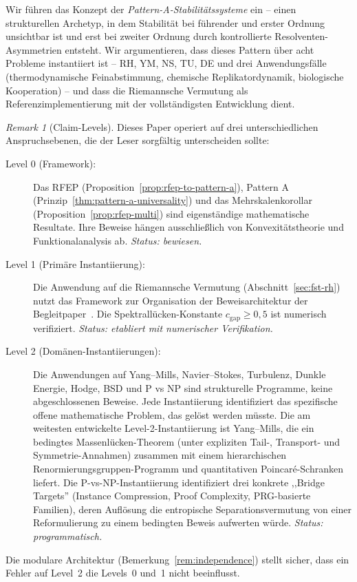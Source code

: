 \documentclass[12pt,a4paper]{article}
\theoremstyle{definition}
\theoremstyle{remark}
\newtheorem{remark}[theorem]{Remark}
\begin{document}
Wir führen das Konzept der \emph{Pattern-A-Stabilitätssysteme} ein -- einen strukturellen Archetyp, in dem Stabilität bei führender und erster Ordnung unsichtbar ist und erst bei zweiter Ordnung durch kontrollierte Resolventen-Asymmetrien entsteht. Wir argumentieren, dass dieses Pattern über acht Probleme instantiiert ist -- RH, YM, NS, TU, DE und drei Anwendungsfälle (thermodynamische Feinabstimmung, chemische Replikatordynamik, biologische Kooperation) -- und dass die Riemannsche Vermutung als Referenzimplementierung mit der vollständigsten Entwicklung dient.

\begin{remark}[Claim-Levels]
\label{rem:claim-levels}
Dieses Paper operiert auf drei unterschiedlichen Anspruchsebenen, die der Leser sorgfältig unterscheiden sollte:
\begin{description}
\item[Level 0 (Framework):] Das RFEP (Proposition~\ref{prop:rfep-to-pattern-a}), Pattern A (Prinzip~\ref{thm:pattern-a-universality}) und das Mehrskalenkorollar (Proposition~\ref{prop:rfep-multi}) sind eigenständige mathematische Resultate. Ihre Beweise hängen ausschließlich von Konvexitätstheorie und Funktionalanalysis ab. \emph{Status: bewiesen.}
\item[Level 1 (Primäre Instantiierung):] Die Anwendung auf die Riemannsche Vermutung (Abschnitt~\ref{sec:fst-rh}) nutzt das Framework zur Organisation der Beweisarchitektur der Begleitpaper~\cite{Geiger2026a,Geiger2026b,Geiger2026c}. Die Spektrallücken-Konstante $c_{\mathrm{gap}} \geq 0{,}5$ ist numerisch verifiziert. \emph{Status: etabliert mit numerischer Verifikation.}
\item[Level 2 (Domänen-Instantiierungen):] Die Anwendungen auf Yang--Mills, Navier--Stokes, Turbulenz, Dunkle Energie, Hodge, BSD und P vs NP sind strukturelle Programme, keine abgeschlossenen Beweise. Jede Instantiierung identifiziert das spezifische offene mathematische Problem, das gelöst werden müsste. Die am weitesten entwickelte Level-2-Instantiierung ist Yang--Mills, die ein bedingtes Massenl\"ucken-Theorem (unter expliziten Tail-, Transport- und Symmetrie-Annahmen) zusammen mit einem hierarchischen Renormierungsgruppen-Programm und quantitativen Poincar\'e-Schranken liefert. Die P-vs-NP-Instantiierung identifiziert drei konkrete ,,Bridge Targets'' (Instance Compression, Proof Complexity, PRG-basierte Familien), deren Aufl\"osung die entropische Separationsvermutung von einer Reformulierung zu einem bedingten Beweis aufwerten w\"urde. \emph{Status: programmatisch.}
\end{description}
Die modulare Architektur (Bemerkung~\ref{rem:independence}) stellt sicher, dass ein Fehler auf Level~2 die Levels~0 und~1 nicht beeinflusst.
\end{remark}
\end{document}
